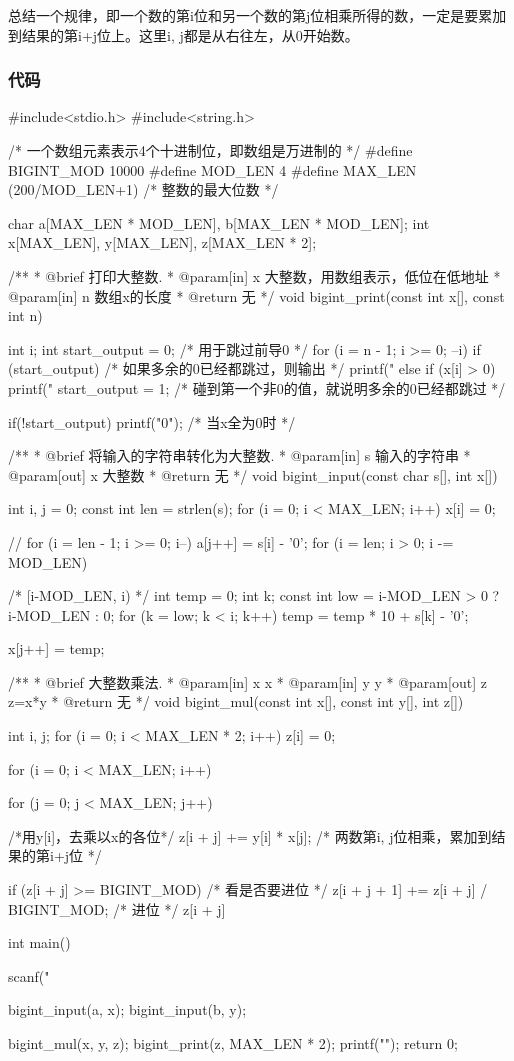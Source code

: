 总结一个规律，即一个数的第i位和另一个数的第j位相乘所得的数，一定是要累加到结果的第i+j位上。这里i, j都是从右往左，从0开始数。

\subsubsection{代码}
\begin{Codex}[label=bigint_mul.c]
#include<stdio.h>
#include<string.h>

/* 一个数组元素表示4个十进制位，即数组是万进制的 */
#define BIGINT_MOD 10000
#define MOD_LEN 4
#define MAX_LEN (200/MOD_LEN+1)  /* 整数的最大位数 */

char    a[MAX_LEN * MOD_LEN], b[MAX_LEN * MOD_LEN];
int     x[MAX_LEN], y[MAX_LEN], z[MAX_LEN * 2];

/**
 * @brief 打印大整数.
 * @param[in] x 大整数，用数组表示，低位在低地址
 * @param[in] n 数组x的长度
 * @return 无
 */
void bigint_print(const int x[], const int n) {
    int i;
    int start_output = 0;  /* 用于跳过前导0 */
    for (i = n - 1; i >= 0; --i) {
        if (start_output) {  /* 如果多余的0已经都跳过，则输出 */
            printf("%
        } else if (x[i] > 0) {
            printf("%
            start_output = 1; /* 碰到第一个非0的值，就说明多余的0已经都跳过 */
        }
    }

    if(!start_output) printf("0");  /* 当x全为0时 */
}

/**
 * @brief 将输入的字符串转化为大整数.
 * @param[in] s 输入的字符串
 * @param[out] x 大整数
 * @return 无
 */
void bigint_input(const char s[], int x[]) {
    int i, j = 0;
    const int len = strlen(s);
    for (i = 0; i < MAX_LEN; i++) x[i] = 0;

    // for (i = len - 1; i >= 0; i--) a[j++] = s[i] - '0';
    for (i = len; i > 0; i -= MOD_LEN) {  /* [i-MOD_LEN, i) */
        int temp = 0;
        int k;
        const int low = i-MOD_LEN > 0 ? i-MOD_LEN : 0;
        for (k = low; k < i; k++) {
            temp = temp * 10 + s[k] - '0';
        }

        x[j++] = temp;
    }
}

/**
 * @brief 大整数乘法.
 * @param[in] x x
 * @param[in] y y
 * @param[out] z z=x*y
 * @return 无
 */
void bigint_mul(const int x[], const int y[], int z[]) {
    int i, j;
    for (i = 0; i < MAX_LEN * 2; i++) z[i] = 0;

    for (i = 0; i < MAX_LEN; i++) {
        for (j = 0; j < MAX_LEN; j++) { /*用y[i]，去乘以x的各位*/
            z[i + j] += y[i] * x[j]; /* 两数第i, j位相乘，累加到结果的第i+j位 */

            if (z[i + j] >= BIGINT_MOD) { /* 看是否要进位 */
                z[i + j + 1] += z[i + j] / BIGINT_MOD; /* 进位 */
                z[i + j] %
            }
        }
    }
}


int main() {
    scanf("%

    bigint_input(a, x);
    bigint_input(b, y);

    bigint_mul(x, y, z);
    bigint_print(z, MAX_LEN * 2);
    printf("\n");
    return 0;
}
\end{Codex}

